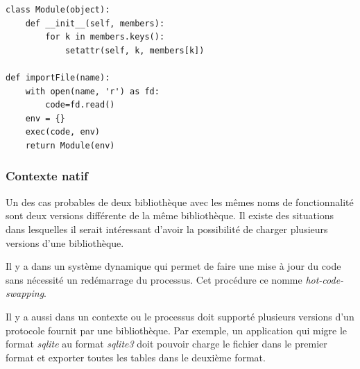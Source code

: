 \begin{verbatim}
class Module(object):
    def __init__(self, members):
        for k in members.keys():
            setattr(self, k, members[k])

def importFile(name):
    with open(name, 'r') as fd:
        code=fd.read()
    env = {}
    exec(code, env)
    return Module(env)

\end{verbatim}

\subsubsection{Contexte natif}

Un des cas probables de deux bibliothèque avec les mêmes noms de fonctionnalité
sont deux versions différente de la même bibliothèque. Il existe des situations
dans lesquelles il serait intéressant d'avoir la possibilité de charger plusieurs
versions d'une bibliothèque.

Il y a dans un système dynamique qui permet de faire une mise à jour du
code sans nécessité un redémarrage du processus. Cet procédure ce nomme
\textit{hot-code-swapping}.

Il y a aussi dans un contexte ou le processus doit supporté plusieurs versions
d'un protocole fournit par une bibliothèque. Par exemple, un application qui migre
le format \textit{sqlite} au format \textit{sqlite3} doit pouvoir charge le fichier
dans le premier format et exporter toutes les tables dans le deuxième format.


